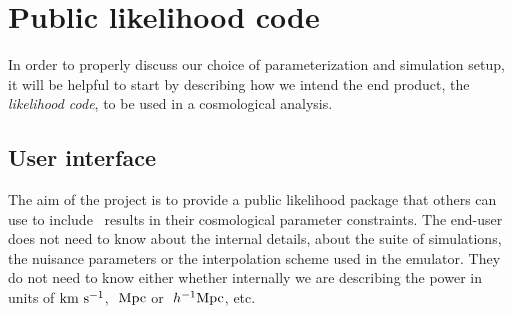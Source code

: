 \section{Public likelihood code} \label{sec:like}

In order to properly discuss our choice of parameterization and simulation
setup, it will be helpful to start by describing how we intend the end
product, the \textit{likelihood code}, to be used in a cosmological analysis.


\subsection{User interface}


The aim of the project is to provide a public likelihood package that others
can use to include \lya\ results in their cosmological parameter constraints.
The end-user does not need to know about the internal details, about the
suite of simulations, the nuisance parameters or the interpolation scheme
used in the emulator.
They do not need to know either whether internally we are describing the
power in units of ${\rm km~s^{-1}}$, $\ \text{Mpc}$ or $\ h^{-1}\text{Mpc}$, etc.

